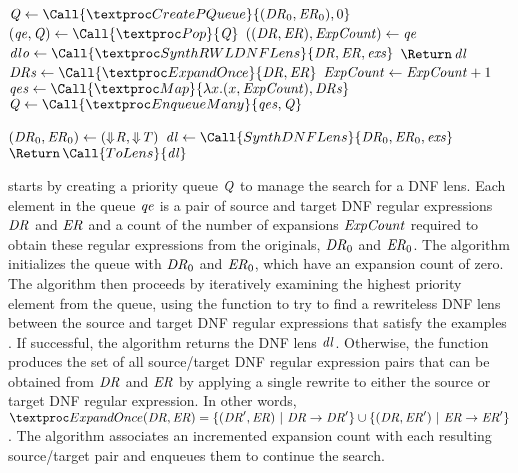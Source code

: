 \documentclass[numbers,10pt,preprint\ifanon ,nocopyrightspace\fi]{sigplanconf}
\begin{document}

\begin{algorithm}
  \caption{\SynthLens}
  \label{alg:synthlens}
  \begin{algorithmic}[1]
    \State $\Queue \gets \Call{\CreatePQueue}{(\DNFRegex_0,\DNFRegexAlt_0),0}$
    \While{$\True$}
    \State $(\QueueElement,\Queue) \gets \Call{\Pop}{\Queue}$
    \State $((\mathit{DR},\mathit{ER}),\mathit{ExpCount}) \gets \mathit{qe}$
    \State $\DNFLensOption \gets
    \Call{\SynthRWLDNFLens}{\DNFRegex,\DNFRegexAlt,\Examples}$
    \Switch{\DNFLensOption}
    \Case {\SomeOf{\DNFLens}}
    \State $\ReturnVal{\DNFLens}$
    \EndCase
    \SecondCase {\None}
    \State $\DNFRegexs \gets \Call{\ExpandOnce}{\DNFRegex,\DNFRegexAlt}$
    \State $\mathit{ExpCount} \gets \mathit{ExpCount}+1$
    \State $\QueueElements \gets \Call{\Map}{\lambda x.(x,\ExpCount),\DNFRegexs}$
    \State $\Queue \gets \Call{\EnqueueMany}{\QueueElements,\Queue}$
    \EndSecondCase

    \EndSwitch
    \EndWhile
    \EndFunction
    \Statex
    \State $(\mathit{DR}_0,\mathit{ER}_0) \gets
    (\Downarrow\mkern-4mu \mathit{R},\Downarrow\mkern-4mu \mathit{T})$
    \State $\DNFLens \gets \Call{SynthDNFLens}{\DNFRegex_0,\DNFRegexAlt_0,\Examples}$
    \State $\ReturnVal{\Call{ToLens}{\DNFLens}}$
    \EndFunction
  \end{algorithmic}
\end{algorithm}

\SynthDNFLens{} starts by creating a priority queue $\mathit{Q}$ to manage
  the search for a DNF lens.  Each element in the queue
  $\mathit{qe}$ is a pair of source and target DNF regular
  expressions $\mathit{DR}$ and $\mathit{ER}$ and a count of the number
  of expansions $\mathit{ExpCount}$ required to obtain these regular
  expressions from the originals, $\mathit{DR}_0$ and
  $\mathit{ER}_0$. The algorithm initializes the queue with
  $\mathit{DR}_0$ and $\mathit{ER}_0$, which have an expansion count of
  zero.  The algorithm then proceeds by iteratively examining the
  highest priority element from the queue, using the
  function \SynthRWLDNFLens{} to try to find a rewriteless DNF lens
  between the source and target DNF regular expressions that satisfy
  the examples \Examples.  If successful, the algorithm returns the
  DNF lens $\mathit{dl}$.  Otherwise, the function \ExpandOnce{} produces
  the set of all source/target DNF regular expression pairs that can
  be obtained from $\mathit{DR}$ and $\mathit{ER}$ by applying a single
  rewrite to either the source or target DNF regular expression.  In
  other words, $\PCF{ExpandOnce}(\DNFRegex,\DNFRegexAlt) =
\SetOf{(\DNFRegex',\DNFRegexAlt) \SuchThat \DNFRegex \Rewrite \DNFRegex'}
\Union
\SetOf{(\DNFRegex,\DNFRegexAlt') \SuchThat \DNFRegexAlt \Rewrite \DNFRegexAlt'}$.
  The algorithm associates an incremented expansion count with each
  resulting source/target pair and enqueues them to continue the search.
\end{document}
